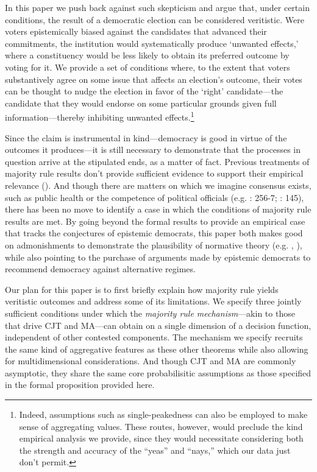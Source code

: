 \documentclass[11pt]{article}
\begin{document}
In this paper we push back against such skepticism and argue that, under certain conditions, 
the result of a democratic election can be considered veritistic. Were voters epistemically biased against the candidates that advanced their commitments, the institution would systematically produce `unwanted effects,' where a constituency would be less likely to obtain its preferred outcome by voting for it. We provide a set of conditions where, to the extent that voters substantively agree on some issue that affects an election's outcome, their votes can be thought to nudge the election in favor of the `right' candidate---the candidate that they would endorse on some particular grounds given full information---thereby inhibiting unwanted effects.\footnote{Indeed, assumptions such as single-peakedness can also be employed to  make sense of aggregating values. These routes, however, would preclude the kind empirical analysis we provide, since they would necessitate considering both the strength and accuracy of the ``yeas'' and ``nays,'' which our data just don't permit.} 

Since the claim is instrumental in kind---democracy is good in virtue of the outcomes it produces---it is still necessary to demonstrate that the processes in question arrive at the stipulated ends, as a matter of fact. Previous treatments of majority rule results don't provide sufficient evidence to support their empirical relevance  
(\cite{schwartzberg2015epistemic}). And though there are matters on which we imagine consensus exists, such as public health or the competence of political officials (e.g. \cite{Page2007}: 256-7; \cite{Landemore13}: 145), there has been no move to identify a case in which the conditions of majority rule results are met. By going beyond the formal results to provide an empirical case that tracks the conjectures of epistemic democrats, this paper both makes good on admonishments to demonstrate the plausibility of normative theory (e.g. \cite{rehfeld2010offensive}, \cite{wiens2015against}), while also pointing to the purchase of arguments made by epistemic democrats to recommend democracy against alternative regimes.


Our plan for this paper is to first briefly explain how majority rule
yields veritistic outcomes and address some of its limitations. We specify three jointly sufficient conditions
under which the \emph{majority rule mechanism}---akin to those that drive CJT and MA---can obtain on a single dimension of a decision
function, independent of other contested components.
The mechanism we specify recruits the same kind of aggregative features as these other theorems while also allowing for multidimensional considerations. %
And though CJT and MA are commonly asymptotic, they share the same core probabilisitic assumptions as those specified in the formal proposition provided here. 
\end{document}
